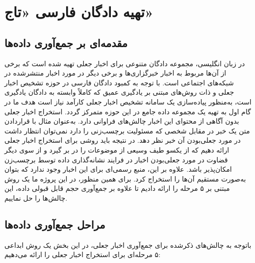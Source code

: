 \chapter{تهیه دادگان فارسی «تاج»}
\section{مقدمه‌ای بر جمع‌آوری داده‌ها}
در زبان انگلیسی، مجموعه‌ دادگان متنوعی برای اخبار جعلی تهیه شده‌ است که برخی از آن‌ها مربوط به اخبار خبرگزاری‌ها و برخی دیگر در مورد اخبار منتشرشده در شبکه‌های اجتماعی است. با توجه به کمبود دادگان فارسی در حوزه تشخیص اخبار جعلی و ذات روش‌های مبتنی ‌بر یادگیری عمیق که کاملاً وابسته به دادگان یادگیری است، به‌منظور پیاده‌سازی یک سامانه تشخیص اخبار جعلی کارآمد نیاز است هدف ما در گام اول به تهیه یک مجموعه داده جامع در این حوزه متمرکز گردد. استخراج اخبار جعلی بدون آگاهی از محتوای این اخبار چالش‌های فراوانی دارد. به‌عنوان مثال با قراردادن متن یک خبر در مقابل شخصی که مسئولیت برچسب‌زنی را دارد نمی‌توان انتظار داشت در مورد جعلی‌بودن آن خبر نظر دهد. در نتیجه باید روشی برای استخراج اخبار جعلی ارائه دهیم که از یکسو طیف وسیعی از موضوعات را در بر گیرد و از سوی دیگر قضاوت در مورد جعلی‌بودن اخبار در فرایند نشانه‌گذاری داده توسط برچسب‌زن امکان‌پذیر باشد. علاوه بر این، منبع رسمی‌ای برای این اخبار وجود ندارد که بتوان به‌صورت مستقیم آن‌ها را استخراج کرد. برای همین منظور، در این پروژه ما یک روش مبتنی‌ بر ۵ مرحله را ارائه دادیم تا علاوه بر جمع‌آوری حجم قابل قبولی داده، این چالش‌ها را حل نماییم.

\section{مراحل جمع‌آوری داده‌ها}
باتوجه ‌به چالش‌های ذکرشده برای جمع‌آوری اخبار جعلی، در این بخش  یک روش ابداعی ۵ مرحله‌ای برای استخراج  اخبار جعلی را ارائه  می‌دهیم:

